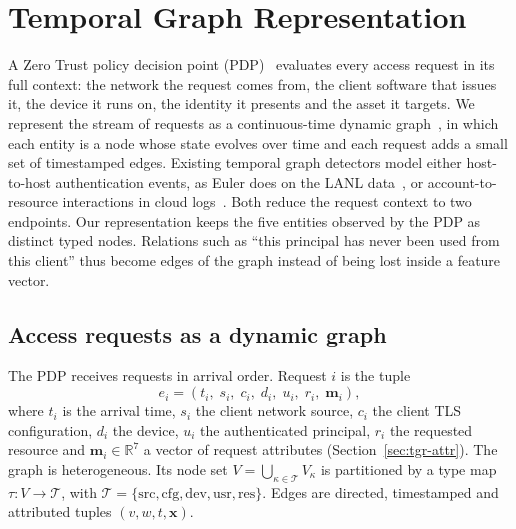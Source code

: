 %
%
%

\section{Temporal Graph Representation}
\label{sec:tgr}

A Zero Trust policy decision point (PDP)~\cite{nist800207} evaluates every access
request in its full context: the network the request comes from, the client software
that issues it, the device it runs on, the identity it presents and the asset it
targets. We represent the stream of requests as a continuous-time dynamic
graph~\cite{jodie,tgn}, in which each entity is a node whose state evolves over time and
each request adds a small set of timestamped edges. Existing temporal graph detectors
model either host-to-host authentication events, as Euler does on the LANL
data~\cite{euler,lanl}, or account-to-resource interactions in cloud
logs~\cite{cloudtrailtgn}. Both reduce the request context to two endpoints. Our representation keeps the five entities observed by the
PDP as distinct typed nodes. Relations such as ``this principal has never been used
from this client'' thus become edges of the graph instead of being lost inside a
feature vector.

\subsection{Access requests as a dynamic graph}

The PDP receives requests in arrival order. Request $i$ is the tuple
\begin{equation}
  e_i = \left(t_i,\; s_i,\; c_i,\; d_i,\; u_i,\; r_i,\; \mathbf{m}_i\right),
  \label{eq:tgr-event}
\end{equation}
where $t_i$ is the arrival time, $s_i$ the client network source, $c_i$ the client TLS
configuration, $d_i$ the device, $u_i$ the authenticated principal, $r_i$ the requested
resource and $\mathbf{m}_i \in \mathbb{R}^{7}$ a vector of request attributes
(Section~\ref{sec:tgr-attr}). The graph is heterogeneous. Its node set
$V = \bigcup_{\kappa \in \mathcal{T}} V_\kappa$ is partitioned by a type map
$\tau : V \to \mathcal{T}$, with
$\mathcal{T} = \{\mathrm{src}, \mathrm{cfg}, \mathrm{dev}, \mathrm{usr}, \mathrm{res}\}$.
Edges are directed, timestamped and attributed tuples $(v, w, t, \mathbf{x})$.

